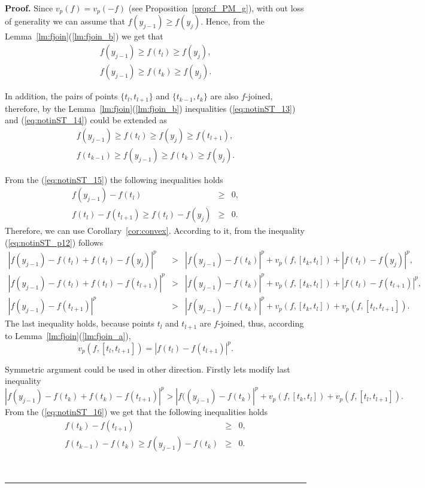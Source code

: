 \documentclass[12pt, a4paper]{article}
\newenvironment{proof}[1][Proof]{\noindent \textbf{#1.} }{\  \rule{0.5em}{0.5em}}
\numberwithin{equation}{section}
\begin{document}
\begin{proof}
  Since $v_p(f)=v_p(-f)$ (see Proposition~\ref{prop:f_PM_g}), 
  with out loss of generality we can assume that
  $f(y_{j-1}) \geq f(y_j)$. 
  Hence, from the Lemma~\ref{lm:fjoin}(\ref{lm:fjoin_b}) 
  we get that
  \begin{eqnarray}
    f(y_{j-1}) \geq f(t_{l}) \geq f(y_j), \label{eq:notinST_13}  \\
    f(y_{j-1}) \geq f(t_{k}) \geq f(y_j). \label{eq:notinST_14}
  \end{eqnarray}  

  In addition, the pairs of points $\{t_l,t_{l+1}\}$ 
  and $\{t_{k-1},t_{k}\}$ are also $f$-joined, therefore,
  by the Lemma~\ref{lm:fjoin}(\ref{lm:fjoin_b})
  inequalities (\ref{eq:notinST_13}) and (\ref{eq:notinST_14})
  could be extended as
  \begin{eqnarray}
    \label{eq:notinST_15} 
    f(y_{j-1}) \geq f(t_{l}) \geq f(y_j) \geq f(t_{l+1}),  \\
    \label{eq:notinST_16}
    f(t_{k-1}) \geq f(y_{j-1}) \geq f(t_{k}) \geq f(y_j). 
  \end{eqnarray}         
    
  
  From the (\ref{eq:notinST_15}) the following inequalities holds
  \begin{eqnarray*}
    f(y_{j-1})-f(t_l) &\geq& 0, \\
    f(t_{l})-f(t_{l+1}) \geq f(t_l)-f(y_j) & \geq & 0.
  \end{eqnarray*} 
  Therefore, we can use Corollary~\ref{cor:convex}. According to it,
  from the inequality (\ref{eq:notinST_p12}) follows  
  \begin{eqnarray*}
    |f(y_{j-1})-f(t_l)+f(t_l)-f(y_j)|^p &>& |f(y_{j-1})-f(t_{k})|^p +
       v_p(f,[t_k,t_l]) +  |f(t_{l})-f(y_j)|^p, \\  
    |f(y_{j-1})-f(t_l)+f(t_l)-f(t_{l+1})|^p &>&|f(y_{j-1})-f(t_{k})|^p
      + v_p(f,[t_k,t_l]) +  |f(t_{l})-f(t_{l+1})|^p, \\
    |f(y_{j-1})-f(t_{l+1})|^p &>& |f(y_{j-1})-f(t_{k})|^p 
      + v_p(f,[t_k,t_l]) +  v_p(f,[t_l,t_{l+1}]). 
  \end{eqnarray*}    
  The last inequality holds,
  because points $t_{l}$ and $t_{l+1}$ are $f$-joined,
  thus, according to Lemma~\ref{lm:fjoin}(\ref{lm:fjoin_a}),
  \begin{equation*}\label{eq:notinST_17}
    v_p(f,[t_l,t_{l+1}]) = |f(t_{l})-f(t_{l+1})|^p.
  \end{equation*}   


  
  Symmetric argument could be used in other direction. 
  Firstly lets modify last inequality
  \begin{equation*}\label{eq:notinST_18}
    |f(y_{j-1})-f(t_k)+f(t_k)-f(t_{l+1})|^p > |f((y_{j-1})-f(t_{k})|^p 
      + v_p(f,[t_k,t_l]) +  v_p(f,[t_l,t_{l+1}]). 
  \end{equation*}   
  From the (\ref{eq:notinST_16}) we get that
   the following inequalities holds
  \begin{eqnarray*}
    f(t_k)-f(t_{l+1}) & \geq & 0, \\
    f(t_{k-1})-f(t_{k}) \geq f(y_{j-1})-f(t_k) & \geq & 0.
  \end{eqnarray*} 


\end{proof}
\end{document}
